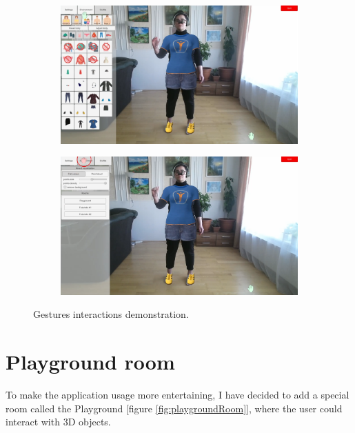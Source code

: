 \documentclass[a4paper]{report}
\begin{document}
\begin{figure}[H]
    \begin{figure}[H]
    \centering
    \includegraphics[width=\textwidth, keepaspectratio]{images/UI/gestures_1.png}
    \label{fig:gestures_1}
    \end{figure}
    
    \begin{figure}[H]
    \centering
    \includegraphics[width=\textwidth, keepaspectratio]{images/UI/gestures_2.png}
    \label{fig:gestures_2}
    \end{figure}
    
    \caption{Gestures interactions demonstration.}
    \label{fig:gestures}
\end{figure}




\section{Playground room}

\qquad To make the application usage more entertaining, I have decided to add a special room called the Playground [figure \ref{fig:playgroundRoom}], where the user could interact with 3D objects. 
\end{document}
